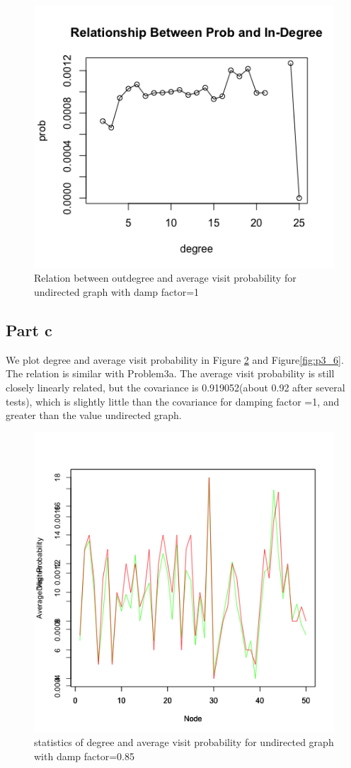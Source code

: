 \documentclass{article}
\begin{document}
\begin{figure}[htbp]
\centering
\includegraphics[width=.6\textwidth]{p3_8.png}
\caption{Relation between outdegree and average visit probability for undirected graph with damp factor=1}
\label{fig:p3_8}
\end{figure}
\subsection{Part c}
We plot degree and  average visit probability in Figure \ref{fig:p3_5} and Figure\ref{fig:p3_6}. The relation is similar with Problem3a. The average visit probability is still closely linearly related, but the covariance  is 0.919052(about 0.92 after several tests), which is slightly little than the covariance for damping factor =1, and greater than the value undirected graph.
\begin{figure}[htbp]
\centering
\includegraphics[width=.6\textwidth]{p3_5.png}
\caption{statistics of degree and average visit probability for undirected graph with damp factor=0.85}
\label{fig:p3_5}
\end{figure}
\end{document}
